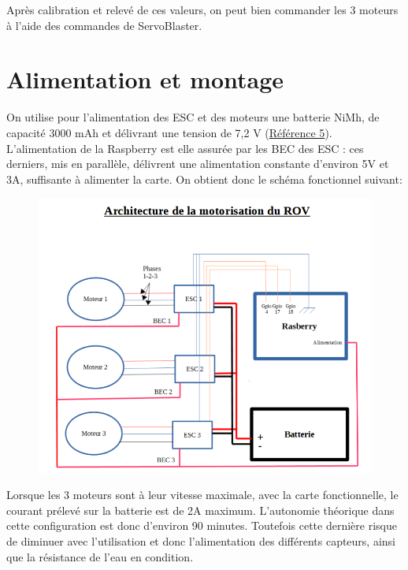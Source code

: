 \documentclass[a4paper,11pt]{report}
\begin{document}
				Après calibration et relevé de ces valeurs, on peut bien commander les 3 moteurs à l'aide des commandes de ServoBlaster. \newpage
				
				\section{Alimentation et montage}
				
				On utilise pour l'alimentation des ESC et des moteurs une batterie NiMh, de capacité 3000 mAh et délivrant une tension de 7,2 V (\href{http://www.conrad.fr/ce/fr/product/206028/Batterie-daccumulateurs-NiMh-72-V-3000-mAh-Conrad-energy-206028-stick-fiche-Tamiya-mle?ref=searchDetail}{Référence 5}). L'alimentation de la Raspberry est elle assurée par les BEC des ESC : ces derniers, mis en parallèle, délivrent une alimentation constante d'environ 5V et 3A, suffisante à alimenter la carte. On obtient donc le schéma fonctionnel suivant:
				\begin{figure}[!h]
				  \begin{center}
				  	\includegraphics[scale=0.7]{Photos/archi_rov}
				  \end{center}
		  	\end{figure}
				
				
				Lorsque les 3 moteurs sont à leur vitesse maximale, avec la carte fonctionnelle, le courant prélevé sur la batterie est de 2A maximum. L'autonomie théorique dans cette configuration est donc d'environ 90 minutes. Toutefois cette dernière risque de diminuer avec l'utilisation et donc l'alimentation des différents capteurs, ainsi que la résistance de l'eau en condition.
				
\end{document}
